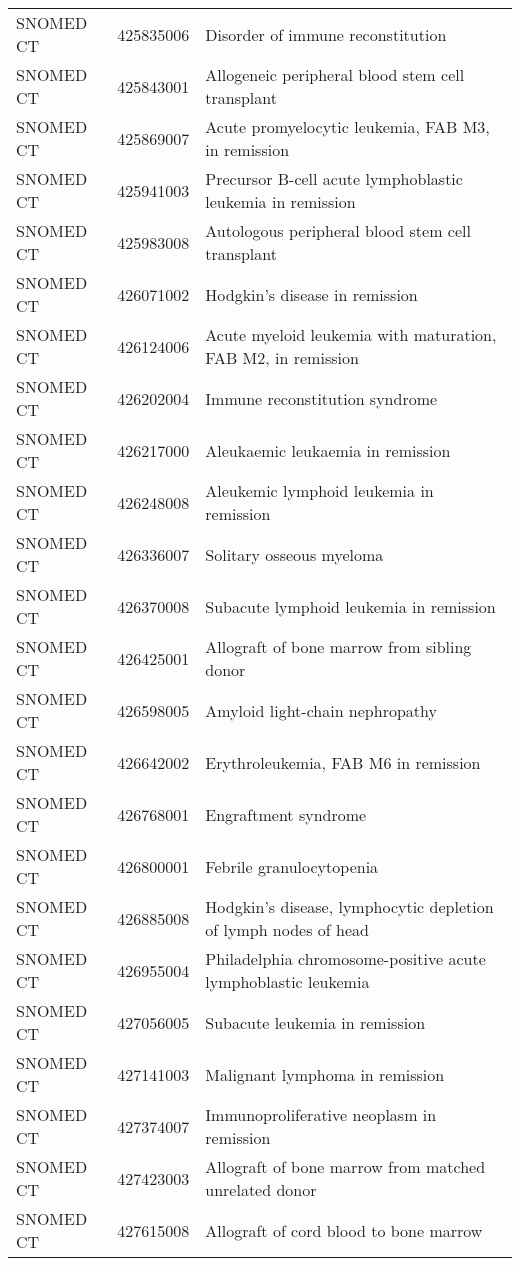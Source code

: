 \begin{longtable}{p{}p{}p{}}
  SNOMED CT & 425835006 & Disorder of immune reconstitution \\ 
  SNOMED CT & 425843001 & Allogeneic peripheral blood stem cell transplant \\ 
  SNOMED CT & 425869007 & Acute promyelocytic leukemia, FAB M3, in remission \\ 
  SNOMED CT & 425941003 & Precursor B-cell acute lymphoblastic leukemia in remission \\ 
  SNOMED CT & 425983008 & Autologous peripheral blood stem cell transplant \\ 
  SNOMED CT & 426071002 & Hodgkin's disease in remission \\ 
  SNOMED CT & 426124006 & Acute myeloid leukemia with maturation, FAB M2, in remission \\ 
  SNOMED CT & 426202004 & Immune reconstitution syndrome \\ 
  SNOMED CT & 426217000 & Aleukaemic leukaemia in remission \\ 
  SNOMED CT & 426248008 & Aleukemic lymphoid leukemia in remission \\ 
  SNOMED CT & 426336007 & Solitary osseous myeloma \\ 
  SNOMED CT & 426370008 & Subacute lymphoid leukemia in remission \\ 
  SNOMED CT & 426425001 & Allograft of bone marrow from sibling donor \\ 
  SNOMED CT & 426598005 & Amyloid light-chain nephropathy \\ 
  SNOMED CT & 426642002 & Erythroleukemia, FAB M6 in remission \\ 
  SNOMED CT & 426768001 & Engraftment syndrome \\ 
  SNOMED CT & 426800001 & Febrile granulocytopenia \\ 
  SNOMED CT & 426885008 & Hodgkin's disease, lymphocytic depletion of lymph nodes of head \\ 
  SNOMED CT & 426955004 & Philadelphia chromosome-positive acute lymphoblastic leukemia \\ 
  SNOMED CT & 427056005 & Subacute leukemia in remission \\ 
  SNOMED CT & 427141003 & Malignant lymphoma in remission \\ 
  SNOMED CT & 427374007 & Immunoproliferative neoplasm in remission \\ 
  SNOMED CT & 427423003 & Allograft of bone marrow from matched unrelated donor \\ 
  SNOMED CT & 427615008 & Allograft of cord blood to bone marrow \\ 

\end{longtable}
